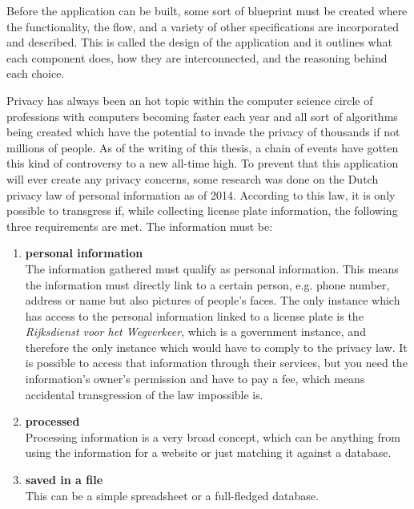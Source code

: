 Before the application can be built, some sort of blueprint must be created where the functionality, the flow, and a variety of other specifications are incorporated and described. This is called the design of the application and it outlines what each component does, how they are interconnected, and the reasoning behind each choice.


Privacy has always been an hot topic within the computer science circle of professions with computers becoming faster each year and all sort of algorithms being created which have the potential to invade the privacy of thousands if not millions of people. As of the writing of this thesis, a chain of events have gotten this kind of controversy to a new all-time high. 
To prevent that this application will ever create any privacy concerns, some research was done on the Dutch privacy law of personal information as of 2014. According to this law, it is only possible to transgress if, while collecting license plate information, the following three requirements are met. The information must be:

\begin{enumerate}
    \item{\textbf{personal information} \\
        The information gathered must qualify as personal information. This means the information must directly link to a certain person, e.g. phone number, address or name but also pictures of people's faces. The only instance which has access to the personal information linked to a license plate is the \textit{Rijksdienst voor het Wegverkeer}, which is a government instance, and therefore the only instance which would have to comply to the privacy law. It is possible to access that information through their services, but you need the information's owner's permission and have to pay a fee, which means accidental transgression of the law impossible is.
    }

    \item{\textbf{processed} \\
        Processing information is a very broad concept, which can be anything from using the information for a website or just matching it against a database.
    }

    \item{\textbf{saved in a file} \\
        This can be a simple spreadsheet or a full-fledged database.
    }
\end{enumerate}

